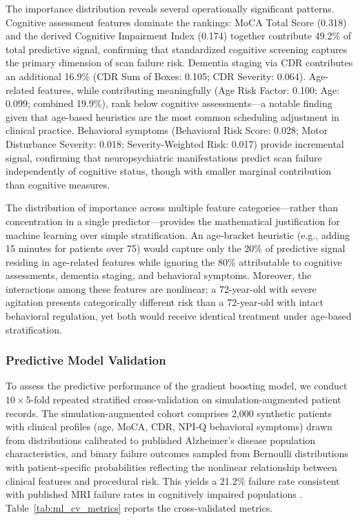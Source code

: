 \documentclass[msom,blindrev]{informs3}
\begin{document}
The importance distribution reveals several operationally significant patterns. Cognitive assessment features dominate the rankings: MoCA Total Score (0.318) and the derived Cognitive Impairment Index (0.174) together contribute 49.2\% of total predictive signal, confirming that standardized cognitive screening captures the primary dimension of scan failure risk. Dementia staging via CDR contributes an additional 16.9\% (CDR Sum of Boxes: 0.105; CDR Severity: 0.064). Age-related features, while contributing meaningfully (Age Risk Factor: 0.100; Age: 0.099; combined 19.9\%), rank below cognitive assessments---a notable finding given that age-based heuristics are the most common scheduling adjustment in clinical practice. Behavioral symptoms (Behavioral Risk Score: 0.028; Motor Disturbance Severity: 0.018; Severity-Weighted Risk: 0.017) provide incremental signal, confirming that neuropsychiatric manifestations predict scan failure independently of cognitive status, though with smaller marginal contribution than cognitive measures.

The distribution of importance across multiple feature categories---rather than concentration in a single predictor---provides the mathematical justification for machine learning over simple stratification. An age-bracket heuristic (e.g., adding 15 minutes for patients over 75) would capture only the 20\% of predictive signal residing in age-related features while ignoring the 80\% attributable to cognitive assessments, dementia staging, and behavioral symptoms. Moreover, the interactions among these features are nonlinear: a 72-year-old with severe agitation presents categorically different risk than a 72-year-old with intact behavioral regulation, yet both would receive identical treatment under age-based stratification.

\subsubsection{Predictive Model Validation}

To assess the predictive performance of the gradient boosting model, we conduct $10 \times 5$-fold repeated stratified cross-validation on simulation-augmented patient records. The simulation-augmented cohort comprises 2,000 synthetic patients with clinical profiles (age, MoCA, CDR, NPI-Q behavioral symptoms) drawn from distributions calibrated to published Alzheimer's disease population characteristics, and binary failure outcomes sampled from Bernoulli distributions with patient-specific probabilities reflecting the nonlinear relationship between clinical features and procedural risk. This yields a 21.2\% failure rate consistent with published MRI failure rates in cognitively impaired populations \citep{porembka2025disparities}. Table~\ref{tab:ml_cv_metrics} reports the cross-validated metrics.
\end{document}
